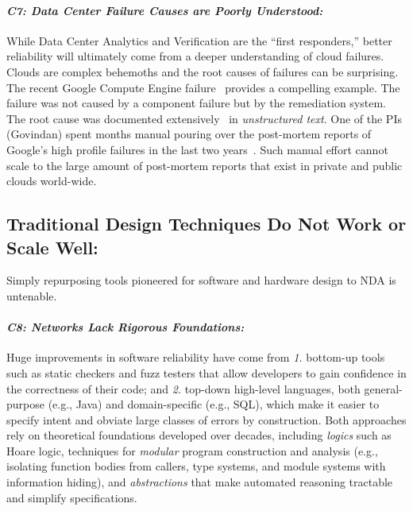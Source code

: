 \paragraph*{\em C7: Data Center Failure Causes are Poorly Understood:}
While Data Center Analytics and Verification are the ``first responders,'' better reliability will ultimately come from a deeper understanding of cloud failures.  Clouds are complex behemoths and the root causes of failures can be surprising. The recent Google Compute Engine failure~\cite{googlefailure} provides a compelling example.  The failure was not caused by a component failure but by the remediation system. The root cause was documented extensively~\cite{googlefailure} in {\em unstructured text}. 
One of the PIs (Govindan) spent months manual pouring over the post-mortem reports of Google's high profile failures in the last two years~\cite{rameshgoogle}. Such manual effort cannot scale to the large amount of post-mortem reports that exist in private and  public clouds world-wide.  

\subsection{Traditional Design Techniques Do Not Work or Scale Well:}
%
Simply repurposing tools pioneered for software and hardware design to NDA is untenable.

\paragraph{\em C8: Networks Lack Rigorous Foundations:}  Huge improvements in software reliability have come from  {\em 1.} bottom-up tools such as static checkers and fuzz testers that allow developers to gain confidence in the correctness of their code; and {\em 2.} top-down high-level languages, both general-purpose (e.g., Java) and domain-specific (e.g., SQL), which make it easier to specify intent and  obviate large classes of errors by construction. Both approaches rely on theoretical foundations developed over decades, including {\em logics} such as Hoare logic, techniques for {\em modular} program construction and analysis (e.g., isolating function bodies from callers, type systems, and module systems with information hiding), and {\em abstractions} that make automated reasoning tractable and simplify specifications.

